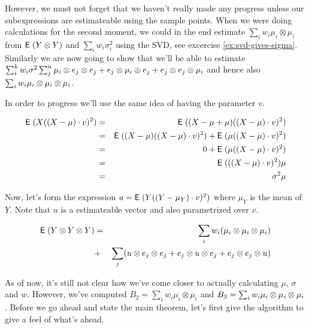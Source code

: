 \documentclass{book}
\numberwithin{exercise}{chapter}
\begin{document}
However, we must not forget that we haven't really made any progress
unless our subexpressions are estimateable using the sample points. When
we were doing calculations for the second moment, we could in the end
estimate $\sum_i w_i \mu_i \otimes \mu_i$ from $\hbox{{\sf E}\;}(Y \otimes Y)$ and
$\sum_i w_i \sigma_i^2$ using the SVD, see excercise
\ref{ex:svd-gives-sigma}. Similarly we are now going to show that we'll
be able to estimate $\sum_i^k w_i \sigma^2 \sum_j^n \mu_i \otimes e_j \otimes e_j + e_j \otimes \mu_i \otimes e_j + e_j \otimes e_j \otimes \mu_i$
and hence also $\sum_i w_i \mu_i \otimes \mu_i \otimes \mu_i$.

In order to progress we'll use the same idea of having the parameter
$v$.

\begin{eqnarray*}
  \hbox{{\sf E}\;}(X((X-\mu) \cdot v)^2)
  &=& \hbox{{\sf E}\;}((X-\mu+\mu)((X-\mu) \cdot v)^2) \\
  &=& \hbox{{\sf E}\;}((X-\mu)((X-\mu) \cdot v)^2) + \hbox{{\sf E}\;}(\mu((X-\mu) \cdot v)^2) \\
  &=& 0 + \hbox{{\sf E}\;}(\mu((X-\mu) \cdot v)^2) \\
  &=& \hbox{{\sf E}\;}(((X-\mu) \cdot v)^2)\mu \\
  &=& \sigma^2 \mu
\end{eqnarray*}


Now, let's form the expression $u = \hbox{{\sf E}\;}(Y((Y-\mu_Y) \cdot v)^2 )$ where
$\mu_Y$ is the mean of $Y$. Note that $u$ is a estimateable vector and
also parametrized over $v$.

\begin{eqnarray*}
  \hbox{{\sf E}\;}(Y \otimes Y \otimes Y)
  &=& \sum_i w_i (\mu_i \otimes \mu_i \otimes \mu_i) \\
  &+& \sum_j (u \otimes e_j \otimes e_j + e_j \otimes u \otimes e_j + e_j \otimes e_j \otimes u)
\end{eqnarray*}

As of now, it's still not clear how we've come closer to actually calculating
$\mu$, $\sigma$ and $w$. However, we've computed $B_2 = \sum_i w_i \mu_i
\otimes \mu_i$ and $B_3 = \sum_i w_i \mu_i \otimes \mu_i \otimes \mu_i$. Before we go ahead
and state the main theorem, let's first give the algorithm to give a feel of
what's ahead.
\end{document}
